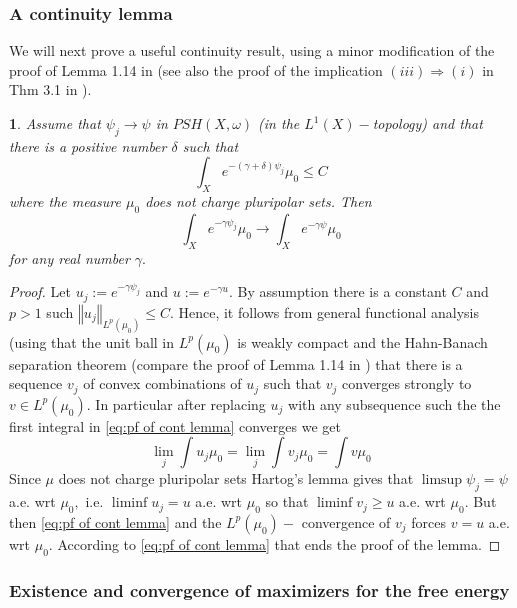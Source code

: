 \documentclass[11pt,oneside,english]{amsart}
\numberwithin{equation}{section}
\numberwithin{figure}{section}
\theoremstyle{plain}
\theoremstyle{plain}
\theoremstyle{plain}
\newtheorem{lem}[thm]{\protect\lemmaname}
\theoremstyle{plain}
\theoremstyle{remark}
\theoremstyle{definition}
\providecommand{\lemmaname}{Lemma}
\begin{document}
\subsubsection{A continuity lemma}

We will next prove a useful continuity result, using a minor modification
of the proof of Lemma 1.14 in \cite{b-b-w} (see also the proof of
the implication $(iii)\Longrightarrow(i)$ in Thm 3.1 in \cite{bbgz}).
\begin{lem}
\label{lem:kont of exp integral with bd}Assume that $\psi_{j}\rightarrow\psi$
in $PSH(X,\omega)$ (in the $L^{1}(X)-$topology) and that there is
a positive number $\delta$ such that 
\[
\int_{X}e^{-(\gamma+\delta)\psi_{j}}\mu_{0}\leq C
\]
 where the measure $\mu_{0}$ does not charge pluripolar sets. Then
\begin{equation}
\int_{X}e^{-\gamma\psi_{j}}\mu_{0}\rightarrow\int_{X}e^{-\gamma\psi}\mu_{0}\label{eq:conv of exp integral in lemma}
\end{equation}
 for any real number $\gamma.$ \end{lem}
\begin{proof}
Let $u_{j}:=e^{-\gamma\psi_{j}}$ and $u:=e^{-\gamma u}.$ By assumption
there is a constant $C$ and $p>1$ such $\left\Vert u_{j}\right\Vert _{L^{p}(\mu_{0})}\leq C.$
Hence, it follows from general functional analysis (using that the
unit ball in $L^{p}(\mu_{0})$ is weakly compact and the Hahn-Banach
separation theorem (compare the proof of Lemma 1.14 in \cite{b-b-w})
that there is a sequence $v_{j}$ of convex combinations of $u_{j}$
such that $v_{j}$ converges strongly to $v\in L^{p}(\mu_{0}).$ In
particular after replacing $u_{j}$ with any subsequence such the
the first integral in \ref{eq:pf of cont lemma} converges we get
\begin{equation}
\lim_{j}\int u_{j}\mu_{0}=\lim_{j}\int v_{j}\mu_{0}=\int v\mu_{0}\label{eq:pf of cont lemma}
\end{equation}
Since $\mu$ does not charge pluripolar sets Hartog's lemma \cite{g-z}
gives that $\limsup\psi_{j}=\psi$ a.e. wrt $\mu_{0},$ i.e. $\liminf u_{j}=u$
a.e. wrt $\mu_{0}$ so that $\liminf v_{j}\geq u$ a.e. wrt $\mu_{0}.$
But then \ref{eq:pf of cont lemma} and the $L^{p}(\mu_{0})-$ convergence
of $v_{j}$ forces $v=u$ a.e. wrt $\mu_{0}.$ According to \ref{eq:pf of cont lemma}
that ends the proof of the lemma.
\end{proof}

\subsubsection{Existence and convergence of maximizers for the free energy}
\end{document}
